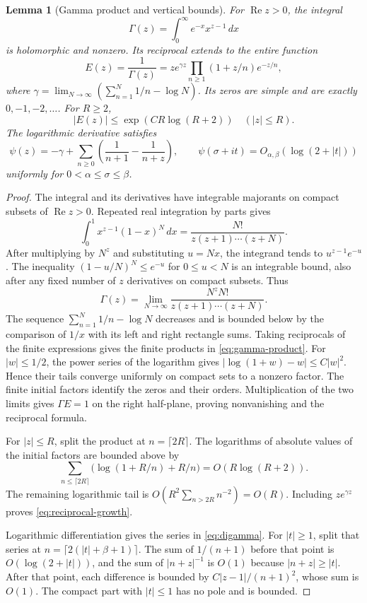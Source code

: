 \documentclass[11pt]{article}
\newtheorem{lemma}[theorem]{Lemma}
\theoremstyle{definition}
\theoremstyle{remark}
\numberwithin{equation}{section}
\begin{document}
\begin{lemma}[Gamma product and vertical bounds]
\label{lem:gamma}
For $\operatorname{Re}z>0$, the integral
\[
 \Gamma(z)=\int_0^\infty e^{-x}x^{z-1}\,dx
\]
is holomorphic and nonzero.  Its reciprocal extends to the entire function
\begin{equation}
 E(z)=\frac1{\Gamma(z)}
 =z e^{\gamma z}\prod_{n\geq1}(1+z/n)e^{-z/n},
 \label{eq:gamma-product}
\end{equation}
where $\gamma=\lim_{N\to\infty}(\sum_{n=1}^N1/n-\log N)$.
Its zeros are simple and are exactly $0,-1,-2,\ldots$.
For $R\geq2$,
\begin{equation}
 |E(z)|\leq\exp(CR\log(R+2))\quad(|z|\leq R).
 \label{eq:reciprocal-growth}
\end{equation}
The logarithmic derivative satisfies
\begin{equation}
 \psi(z)=-\gamma+\sum_{n\geq0}
           \left(\frac1{n+1}-\frac1{n+z}\right),
 \qquad
 \psi(\sigma+it)=O_{\alpha,\beta}(\log(2+|t|))
 \label{eq:digamma}
\end{equation}
uniformly for $0<\alpha\leq\sigma\leq\beta$.
\end{lemma}

\begin{proof}
The integral and its derivatives have integrable majorants on compact
subsets of $\operatorname{Re}z>0$.
Repeated real integration by parts gives
\[
 \int_0^1 x^{z-1}(1-x)^N\,dx
       =\frac{N!}{z(z+1)\cdots(z+N)}.
\]
After multiplying by $N^z$ and substituting $u=Nx$, the integrand tends to
$u^{z-1}e^{-u}$.  The inequality $(1-u/N)^N\leq e^{-u}$ for $0\leq u<N$
is an integrable bound, also after any fixed number of $z$ derivatives
on compact subsets.  Thus
\[
 \Gamma(z)=\lim_{N\to\infty}
        \frac{N^zN!}{z(z+1)\cdots(z+N)}.
\]
The sequence $\sum_{n=1}^N1/n-\log N$ decreases and is bounded below
by the comparison of $1/x$ with its left and right rectangle sums.
Taking reciprocals of the finite expressions gives the finite products
in \eqref{eq:gamma-product}.
For $|w|\leq1/2$, the power series of the logarithm gives
$|\log(1+w)-w|\leq C|w|^2$.
Hence their tails converge uniformly on compact sets to a nonzero factor.
The finite initial factors identify the zeros and their orders.
Multiplication of the two limits gives $\Gamma E=1$ on the right half-plane,
proving nonvanishing and the reciprocal formula.

For $|z|\leq R$, split the product at $n=\lceil2R\rceil$.
The logarithms of absolute values of the initial factors are bounded above by
\[
 \sum_{n\leq\lceil2R\rceil}
       \bigl(\log(1+R/n)+R/n\bigr)=O(R\log(R+2)).
\]
The remaining logarithmic tail is $O(R^2\sum_{n>2R}n^{-2})=O(R)$.
Including $z e^{\gamma z}$ proves \eqref{eq:reciprocal-growth}.

Logarithmic differentiation gives the series in \eqref{eq:digamma}.
For $|t|\geq1$, split that series at $n=\lceil2(|t|+\beta+1)\rceil$.
The sum of $1/(n+1)$ before that point is $O(\log(2+|t|))$,
and the sum of $|n+z|^{-1}$ is $O(1)$ because $|n+z|\geq|t|$.
After that point, each difference is bounded by $C|z-1|/(n+1)^2$,
whose sum is $O(1)$.
The compact part with $|t|\leq1$ has no pole and is bounded.
\end{proof}
\end{document}
